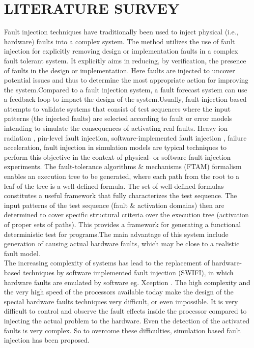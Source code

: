 \chapter{LITERATURE SURVEY}\label{chp:chapter2}
\thispagestyle{fancy}
Fault injection techniques have traditionally been used to
inject physical (i.e., hardware) faults \cite{18} into a complex system.
The method utilizes the use of fault injection for explicitly removing design or implementation faults in a complex fault tolerant system. 
It explicitly aims in reducing, by verification, the presence of faults in the design or implementation. Here faults are injected to uncover potential issues and thus to determine the most appropriate action for improving the system.Compared to a fault injection system, a fault forecast system can use a feedback loop to impact the design of the system.Usually, fault-injection based attempts to validate systems that consist of test sequences where the input patterns (the injected faults) are selected according to fault or error models intending to simulate the consequences of activating real faults. Heavy ion radiation , pin-level fault injection, software-implemented fault injection , failure acceleration, fault injection in simulation models are typical techniques to perform this objective in the context of physical- or software-fault injection experiments. The fault-tolerance algorithms \& mechanisms (FTAM) formalism enables an execution tree to be generated, where each path from the root to
a leaf of the tree is a well-defined formula. The set of well-defined
formulas constitutes a useful framework that fully characterizes the test sequence. The input patterns of the test sequence (fault \& activation domains) then are determined to cover specific structural criteria over the execution tree (activation of proper sets of paths). This provides a framework for generating a functional deterministic test for programs.The main advantage of this system include generation of causing actual hardware faults, which may be close to a realistic fault model.\\
\newline
 The increasing complexity of systems has lead to the replacement of hardware-based techniques by software implemented fault injection (SWIFI), in which hardware faults are
emulated by software eg. Xception \cite{20}. The high complexity and the very high speed of the processors available today make the design of the special
hardware faults techniques very difficult, or even impossible. It is very difficult to control and observe the fault effects inside the processor compared to injecting the actual problem to the hardware. Even the detection of the activated faults is very complex. So to overcome these difficulties, simulation based fault injection has been proposed.
